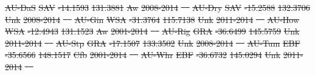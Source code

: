 \documentclass[hess, manuscript]{copernicus}
\providecommand{\DIFdeltex}[1]{{\protect\color{red}\sout{#1}}}                      %
\providecommand{\DIFdel}[1]{\texorpdfstring{\DIFdeltex{#1}}{}} %
\begin{document}
\DIFdel{AU-DaS }%
\DIFdel{SAV }%
\DIFdel{-14.1593 }%
\DIFdel{131.3881 }%
\DIFdel{Aw  }%
\DIFdel{2008-2014 }%
\DIFdel{\mbox{%
\cite{AU-DaS} }%
}%
\DIFdel{AU-Dry }%
\DIFdel{SAV }%
\DIFdel{-15.2588 }%
\DIFdel{132.3706 }%
\DIFdel{Unk }%
\DIFdel{2008-2014 }%
\DIFdel{\mbox{%
\cite{AU-Dry} }%
}%
\DIFdel{AU-Gin }%
\DIFdel{WSA }%
\DIFdel{-31.3764 }%
\DIFdel{115.7138 }%
\DIFdel{Unk }%
\DIFdel{2011-2014 }%
\DIFdel{\mbox{%
\cite{AU-Gin} }%
}%
\DIFdel{AU-How }%
\DIFdel{WSA }%
\DIFdel{-12.4943 }%
\DIFdel{131.1523 }%
\DIFdel{Aw  }%
\DIFdel{2001-2014 }%
\DIFdel{\mbox{%
\cite{AU-How} }%
}%
\DIFdel{AU-Rig }%
\DIFdel{GRA }%
\DIFdel{-36.6499 }%
\DIFdel{145.5759 }%
\DIFdel{Unk }%
\DIFdel{2011-2014 }%
\DIFdel{\mbox{%
\cite{AU-Gin} }%
}%
\DIFdel{AU-Stp }%
\DIFdel{GRA }%
\DIFdel{-17.1507 }%
\DIFdel{133.3502 }%
\DIFdel{Unk }%
\DIFdel{2008-2014 }%
\DIFdel{\mbox{%
\cite{AU-DaP} }%
}%
\DIFdel{AU-Tum }%
\DIFdel{EBF }%
\DIFdel{-35.6566 }%
\DIFdel{148.1517 }%
\DIFdel{Cfb }%
\DIFdel{2001-2014 }%
\DIFdel{\mbox{%
\cite{AU-Tum} }%
}%
\DIFdel{AU-Whr }%
\DIFdel{EBF }%
\DIFdel{-36.6732 }%
\DIFdel{145.0294 }%
\DIFdel{Unk }%
\DIFdel{2011-2014 }%
\DIFdel{\mbox{%
\cite{AU-Whr} }%
}%
\end{document}
